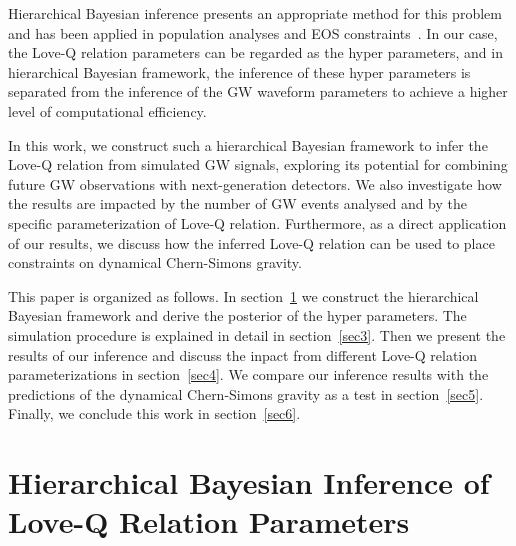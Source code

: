 \documentclass[a4paper,11pt]{article}
\begin{document}
Hierarchical Bayesian inference presents an appropriate method for this problem and has been applied in population analyses and EOS constraints~\cite{Mandel:2009nx, Mandel:2009pc, Adams:2012qw, Lackey:2014fwa, Mandel:2018mve, Thrane_2019, KAGRA:2021duu, Wang:2024xon}.
In our case, the Love-Q relation parameters can be regarded as the hyper parameters, and in hierarchical Bayesian framework, 
the inference of these hyper parameters is separated from the inference of the GW waveform parameters to achieve a higher level of computational efficiency. 

In this work, we construct such a hierarchical Bayesian framework to infer the Love-Q relation from simulated GW signals, exploring its potential for combining future GW observations with next-generation detectors. 
We also investigate how the results are impacted by the number of GW events analysed and by the specific parameterization of Love-Q relation. 
Furthermore, as a direct application of our results, we discuss how the inferred Love-Q relation can be used to place constraints on dynamical Chern-Simons gravity.

This paper is organized as follows. In section~\ref{sec2} we construct the hierarchical Bayesian framework and derive the posterior of the hyper parameters. 
The simulation procedure is explained in detail in section~\ref{sec3}. Then we present the results of our inference and discuss the inpact from different Love-Q relation parameterizations in section~\ref{sec4}. 
We compare our inference results with the predictions of the dynamical Chern-Simons gravity as a test in section~\ref{sec5}. Finally, we conclude this work in section~\ref{sec6}.


\section{Hierarchical Bayesian Inference of Love-Q Relation Parameters}
\label{sec2}

\end{document}
